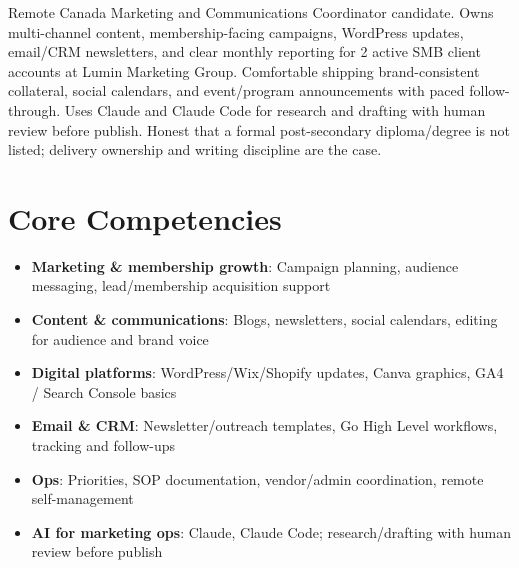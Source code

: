 \documentclass[11pt,a4paper,sans]{moderncv}
\begin{document}
\makecvtitle

\vspace{6pt}
\small{Remote Canada Marketing and Communications Coordinator candidate. Owns multi-channel content, membership-facing campaigns, WordPress updates, email/CRM newsletters, and clear monthly reporting for 2 active SMB client accounts at Lumin Marketing Group. Comfortable shipping brand-consistent collateral, social calendars, and event/program announcements with paced follow-through. Uses Claude and Claude Code for research and drafting with human review before publish. Honest that a formal post-secondary diploma/degree is not listed; delivery ownership and writing discipline are the case.}

\section{Core Competencies}
\vspace{1pt}
\begin{itemize}
\item \textbf{Marketing \& membership growth}: Campaign planning, audience messaging, lead/membership acquisition support
\item \textbf{Content \& communications}: Blogs, newsletters, social calendars, editing for audience and brand voice
\item \textbf{Digital platforms}: WordPress/Wix/Shopify updates, Canva graphics, GA4 / Search Console basics
\item \textbf{Email \& CRM}: Newsletter/outreach templates, Go High Level workflows, tracking and follow-ups
\item \textbf{Ops}: Priorities, SOP documentation, vendor/admin coordination, remote self-management
\item \textbf{AI for marketing ops}: Claude, Claude Code; research/drafting with human review before publish
\end{itemize}
\end{document}
